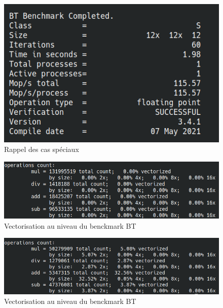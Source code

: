 \documentclass[11pt, letterpaper]{article}
\begin{document}
\label{org787b9c2}
\begin{figure}[htbp]
\centering
\includegraphics[width=450px]{../ressources/btcompleted.png}
\caption{\label{fig:org0670bc7}Rappel des cas spéciaux}
\end{figure}

\label{orgd270c02}
\begin{figure}[htbp]
\centering
\includegraphics[width=450px]{../ressources/vect1.png}
\caption{\label{fig:org29511a8}Vectorisation au niveau du benckmark BT}
\end{figure}

\label{orga01e0b3}
\begin{figure}[htbp]
\centering
\includegraphics[width=450px]{../ressources/vcopenmp.png}
\caption{\label{fig:org8d502f9}Vectorisation au niveau du benckmark BT}
\end{figure}
\end{document}
